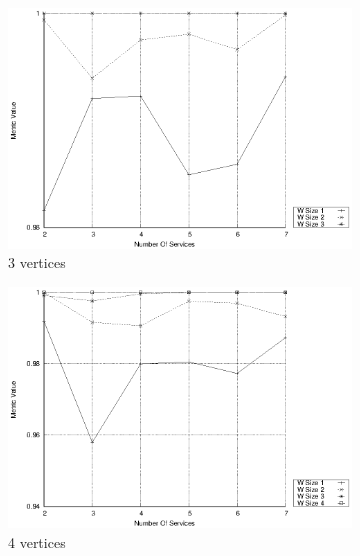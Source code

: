 \begin{figure}[h]
  \centering
  \begin{subfigure}{0.33\textwidth}
    \includegraphics[width=\textwidth]{Images/graphs/window_quality_performance_diff_qual_n7_s7_50_80_n3}
    \caption{3 vertices}
    \label{fig:quality_window_average_qualitative_n3}
  \end{subfigure}
  \hfill
  \begin{subfigure}{0.33\textwidth}
    \includegraphics[width=\textwidth]{Images/graphs/window_quality_performance_diff_qual_n7_s7_50_80_n4}
    \caption{4 vertices}
    \label{fig:quality_window_average_qualitative_n4}
  \end{subfigure}
  \hfill
  \begin{subfigure}{0.33\textwidth}

\end{subfigure}
\end{figure}
